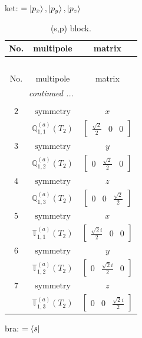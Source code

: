 \documentclass[fleqn,8pt,landscape]{jsarticle}
\begin{document}
\noindent
ket: $=\ket{p_{x}}, \ket{p_{y}}, \ket{p_{z}}$
\renewcommand{\arraystretch}{1.6}
\begin{longtable}{ccc}
\caption{(s,p) block.}
 \\
 \hline \hline
No. & multipole & matrix \\ \hline \endfirsthead

\multicolumn{2}{l}{\tablename\ \thetable{}} \\
 \hline \hline
No. & multipole & matrix \\ \hline \endhead

 \hline \hline
\multicolumn{2}{r}{\footnotesize\it continued ...} \\ \endfoot

 \hline \hline
\multicolumn{2}{r}{} \\ \endlastfoot

$ 2 $ & $ \text{symmetry} $ & $ x $ \\
$  $ & $ \mathbb{Q}_{1,1}^{(a)}(T_{2}) $ & $ \begin{bmatrix} \frac{\sqrt{2}}{2} & 0 & 0 \end{bmatrix} $ \\ \hline
$ 3 $ & $ \text{symmetry} $ & $ y $ \\
$  $ & $ \mathbb{Q}_{1,2}^{(a)}(T_{2}) $ & $ \begin{bmatrix} 0 & \frac{\sqrt{2}}{2} & 0 \end{bmatrix} $ \\ \hline
$ 4 $ & $ \text{symmetry} $ & $ z $ \\
$  $ & $ \mathbb{Q}_{1,3}^{(a)}(T_{2}) $ & $ \begin{bmatrix} 0 & 0 & \frac{\sqrt{2}}{2} \end{bmatrix} $ \\ \hline
$ 5 $ & $ \text{symmetry} $ & $ x $ \\
$  $ & $ \mathbb{T}_{1,1}^{(a)}(T_{2}) $ & $ \begin{bmatrix} \frac{\sqrt{2} i}{2} & 0 & 0 \end{bmatrix} $ \\ \hline
$ 6 $ & $ \text{symmetry} $ & $ y $ \\
$  $ & $ \mathbb{T}_{1,2}^{(a)}(T_{2}) $ & $ \begin{bmatrix} 0 & \frac{\sqrt{2} i}{2} & 0 \end{bmatrix} $ \\ \hline
$ 7 $ & $ \text{symmetry} $ & $ z $ \\
$  $ & $ \mathbb{T}_{1,3}^{(a)}(T_{2}) $ & $ \begin{bmatrix} 0 & 0 & \frac{\sqrt{2} i}{2} \end{bmatrix} $ \\ \hline
\end{longtable}
bra: $=\bra{s}$
\end{document}
